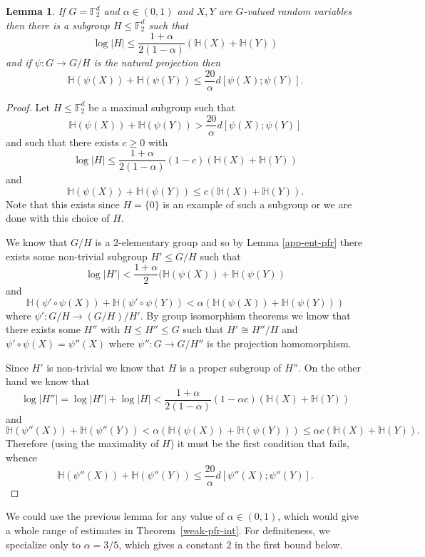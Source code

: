 \documentclass[10pt,a4paper]{article}
\newtheorem{lemma}[theorem]{Lemma}
\newcommand{\lean}[1]{}
\newcommand{\uses}[1]{}
\newcommand{\leanok}{}
\begin{document}
\begin{lemma}\label{pfr-projection'}\lean{PFR_projection'}\leanok
If $G=\mathbb{F}_2^d$ and $\alpha\in (0,1)$ and $X,Y$ are $G$-valued random
variables then there is a subgroup $H\leq \mathbb{F}_2^d$ such that
\[\log \lvert H\rvert \leq \frac{1+\alpha}{2(1-\alpha)} (\mathbb{H}(X)+\mathbb{H}(Y))\]
and if $\psi:G \to G/H$ is the natural projection then
\[\mathbb{H}(\psi(X))+\mathbb{H}(\psi(Y))\leq \frac{20}{\alpha} d[\psi(X);\psi(Y)].\]
\end{lemma}
\begin{proof}
\uses{app-ent-pfr}\leanok
Let $H\leq \mathbb{F}_2^d$ be a maximal subgroup such that
\[\mathbb{H}(\psi(X))+\mathbb{H}(\psi(Y))> \frac{20}{\alpha} d[\psi(X);\psi(Y)]\]
and such that there exists $c \ge 0$ with
\[\log \lvert H\rvert \leq \frac{1+\alpha}{2(1-\alpha)}(1-c)(\mathbb{H}(X)+\mathbb{H}(Y))\]
and
\[\mathbb{H}(\psi(X))+\mathbb{H}(\psi(Y))\leq c (\mathbb{H}(X)+\mathbb{H}(Y)).\]
Note that this exists since $H=\{0\}$ is an example of such a subgroup or we are done with this choice of $H$.

We know that $G/H$ is a $2$-elementary group and so by Lemma
\ref{app-ent-pfr} there exists some non-trivial subgroup $H'\leq G/H$ such
that
\[\log \lvert H'\rvert < \frac{1+\alpha}{2}(\mathbb{H}(\psi(X))+\mathbb{H}(\psi(Y))\]
and
\[\mathbb{H}(\psi' \circ\psi(X))+\mathbb{H}(\psi' \circ \psi(Y))< \alpha(\mathbb{H}(\psi(X))+\mathbb{H}(\psi(Y)))\]
where $\psi':G/H\to (G/H)/H'$. By group isomorphism theorems we know that
there exists some $H''$ with $H\leq H''\leq G$ such that $H'\cong H''/H$ and
$\psi' \circ \psi(X)=\psi''(X)$ where $\psi'':G\to G/H''$ is the projection
homomorphism.

Since $H'$ is non-trivial we know that $H$ is a proper subgroup of $H''$. On the other hand we know that
\[\log \lvert H''\rvert=\log \lvert H'\rvert+\log \lvert H\rvert< \frac{1+\alpha}{2(1-\alpha)}(1-\alpha c)(\mathbb{H}(X)+\mathbb{H}(Y))\]
and
\[\mathbb{H}(\psi''(X))+\mathbb{H}(\psi''(Y))< \alpha (\mathbb{H}(\psi(X))+\mathbb{H}(\psi(Y)))\leq \alpha c (\mathbb{H}(X)+\mathbb{H}(Y)).\]
Therefore (using the maximality of $H$) it must be the first condition that fails, whence
\[\mathbb{H}(\psi''(X))+\mathbb{H}(\psi''(Y))\leq \frac{20}{\alpha}d[\psi''(X);\psi''(Y)].\]
\end{proof}

We could use the previous lemma for any value of $\alpha \in (0,1)$, which
would give a whole range of estimates in Theorem~\ref{weak-pfr-int}. For
definiteness, we specialize only to $\alpha=3/5$, which gives a constant $2$
in the first bound below.
\end{document}

